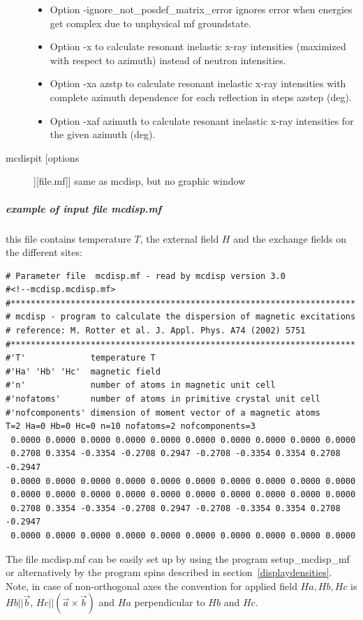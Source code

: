 \begin{description}
\begin{itemize}
    \item Option {\prg -ignore\_not\_posdef\_matrix\_error} ignores error when energies get complex due to unphysical mf groundstate.
    \item Option {\prg -x} to calculate resonant inelastic x-ray intensities (maximized with respect to azimuth) instead of neutron intensities.
    \item Option {\prg -xa  azstp} to calculate resonant inelastic x-ray intensities with complete azimuth dependence for each reflection in steps azstep (deg).
    \item Option {\prg -xaf  azimuth} to calculate resonant inelastic x-ray intensities for the given azimuth (deg).
				\end{itemize}
\item [\prg mcdispit [options]][file.mf]]  same as {\prg mcdisp}, but no graphic window
\end{description} 

\subparagraph{example of input file {\prg  mcdisp.mf}}
this file contains temperature $T$, the external field $H$ and
the exchange fields on the different sites:

\begin{verbatim}
# Parameter file  mcdisp.mf - read by mcdisp version 3.0
#<!--mcdisp.mcdisp.mf>
#*********************************************************************
# mcdisp - program to calculate the dispersion of magnetic excitations
# reference: M. Rotter et al. J. Appl. Phys. A74 (2002) 5751
#*********************************************************************
#'T'             temperature T
#'Ha' 'Hb' 'Hc'  magnetic field
#'n'             number of atoms in magnetic unit cell
#'nofatoms'      number of atoms in primitive crystal unit cell
#'nofcomponents' dimension of moment vector of a magnetic atoms
T=2 Ha=0 Hb=0 Hc=0 n=10 nofatoms=2 nofcomponents=3
 0.0000 0.0000 0.0000 0.0000 0.0000 0.0000 0.0000 0.0000 0.0000 0.0000
 0.2708 0.3354 -0.3354 -0.2708 0.2947 -0.2708 -0.3354 0.3354 0.2708 -0.2947
 0.0000 0.0000 0.0000 0.0000 0.0000 0.0000 0.0000 0.0000 0.0000 0.0000
 0.0000 0.0000 0.0000 0.0000 0.0000 0.0000 0.0000 0.0000 0.0000 0.0000
 0.2708 0.3354 -0.3354 -0.2708 0.2947 -0.2708 -0.3354 0.3354 0.2708 -0.2947
 0.0000 0.0000 0.0000 0.0000 0.0000 0.0000 0.0000 0.0000 0.0000 0.0000
\end{verbatim}

The file {\prg mcdisp.mf} can be easily set up by using the program {\prg %
setup\_mcdisp\_mf} or alternatively by the program {\prg spins} 
described in section~\ref{displaydensities}.
                            Note, in case of non-orthogonal axes the convention for applied field $Ha, Hb,Hc$                     
                            is $Hb||\vec b$, $Hc||(\vec a \times \vec b)$ and $Ha$ perpendicular to $Hb$ and $Hc$.

